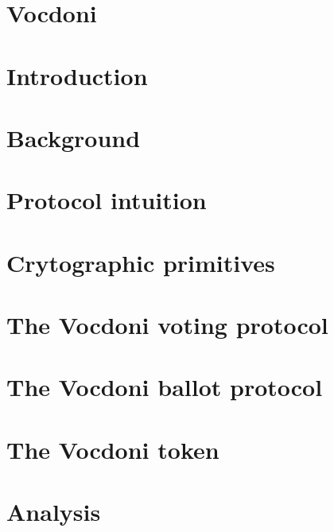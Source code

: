 \documentclass[runningheads, draft]{llncs}
\begin{document}
\setcounter{tocdepth}{3}
\makeatletter
\renewcommand*\l@author[2]{}
\renewcommand*\l@title[2]{}
\makeatletter
\tableofcontents

{}
\section*{Vocdoni}
\label{sec:intro-old}


\section{Introduction}
\label{sec:intro}


\section{Background}
\label{sec:background}


\section{Protocol intuition}
\label{sec:protocol-intuition}


\section{Crytographic primitives} %
\label{sec:cryptographic-primitives}


\section{The Vocdoni voting protocol}
\label{sec:vocdoni-protocol}


\section{The Vocdoni ballot protocol}
\label{sec:ballot-protocol}


\section{The Vocdoni token}
\label{sec:token}


\section{Analysis}
\label{sec:analysis}

\end{document}

